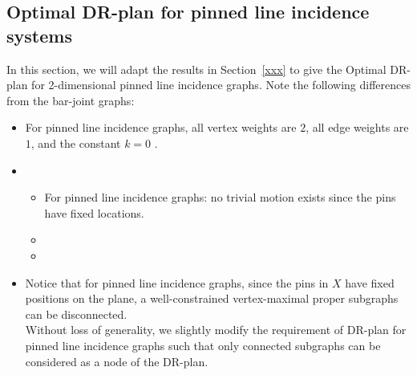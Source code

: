 \subsection{Optimal DR-plan for pinned line incidence systems}


In this section, we will adapt the results in Section~\ref{xxx}
to give the Optimal DR-plan for 2-dimensional pinned line incidence graphs.
Note the following differences from the bar-joint graphs: 

\begin{itemize}

\item For pinned line incidence graphs, all vertex weights are $2$, all edge weights are $1$, 
and the constant $k = 0$ \cite{xxxx}. 

\item 
{}\
\begin{itemize}

\item For  pinned line incidence graphs:
no trivial motion exists since the pins have fixed locations. 


\item 
{}

\item {}

\end{itemize}


\item 
Notice that for pinned line incidence graphs, 
since the pins in $X$ have fixed positions on the plane, 
a well-constrained vertex-maximal proper subgraphs can be disconnected.\\
Without loss of generality, 
we slightly modify the requirement of DR-plan for pinned line incidence graphs
such that only connected subgraphs can be considered as a node of the DR-plan.

\end{itemize}


